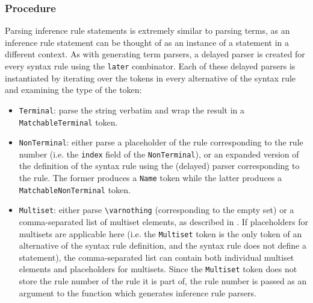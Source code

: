 \subsubsection{Procedure}
Parsing inference rule statements is extremely similar to parsing terms, as an inference rule statement can be thought of as an instance of a statement in a different context. As with generating term parsers, a delayed parser is created  for every syntax rule using the \lstinline{later} combinator. Each of these delayed parsers is instantiated by iterating over the tokens in every alternative of the syntax rule and examining the type of the token:
\begin{itemize}
    \item \lstinline{Terminal}: parse the string verbatim and wrap the result in a \lstinline{MatchableTerminal} token.
    \item \lstinline{NonTerminal}: either parse a placeholder of the rule corresponding to the rule number (i.e. the \lstinline{index} field of the \lstinline{NonTerminal}), or an expanded version of the definition of the syntax rule using the (delayed) parser corresponding to the rule. The former produces a \lstinline{Name} token while the latter produces a \lstinline{MatchableNonTerminal} token.
    \item \lstinline{Multiset}: either parse \lstinline{\varnothing} (corresponding to the empty set) or a comma-separated list of multiset elements, as described in . If placeholders for multisets are applicable here (i.e. the \lstinline{Multiset} token is the only token of an alternative of the syntax rule definition, and the syntax rule does not define a statement), the comma-separated list can contain both individual multiset elements and placeholders for multisets. Since the \lstinline{Multiset} token does not store the rule number of the rule it is part of, the rule number is passed as an argument to the function which generates inference rule parsers.
\end{itemize}
